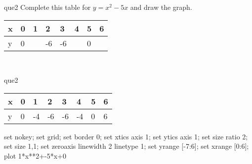 \documentclass[13.5pt, varwidth=true]{beamer}
\begin{document}
\begin{frame}[shrink=19,fragile]
	\begin{beamercolorbox}[rounded=true, left, shadow=true,wd=14.8cm]{que2}
		 Complete this table for $y = x^{2} - 5x$ and draw the graph. \\[0.3cm] \renewcommand{\arraystretch}{1.2}\begin{tabular}{|C|C|C|C|C|C|C|C|} \hline x & 0 & 1 & 2 & 3 & 4 & 5 & 6 \\ \hline y & 0 &  & -6 & -6 &  & 0 & \\ \hline \end{tabular}\\[0.3cm]
	\end{beamercolorbox}
\end{frame}
\begin{frame}[shrink=19,fragile]
	\begin{beamercolorbox}[rounded=true, left, shadow=true,wd=14.8cm]{que2}
		\renewcommand{\arraystretch}{1.2}\begin{tabular}{|C|C|C|C|C|C|C|C|} \hline x & 0 & 1 & 2 & 3 & 4 & 5 & 6 \\ \hline y & 0 & -4 & -6 & -6 & -4 & 0 & 6\\ \hline \end{tabular}\begin{gnuplot}[terminal=pdf] set nokey; set grid; set border 0; set xtics axis 1; set ytics axis 1; set size ratio 2; set size 1,1; set zeroaxis linewidth 2 linetype 1; set yrange [-7:6]; set xrange [0:6]; plot 1*x**2+-5*x+0 \end{gnuplot}
	\end{beamercolorbox}
\end{frame}
\end{document}
